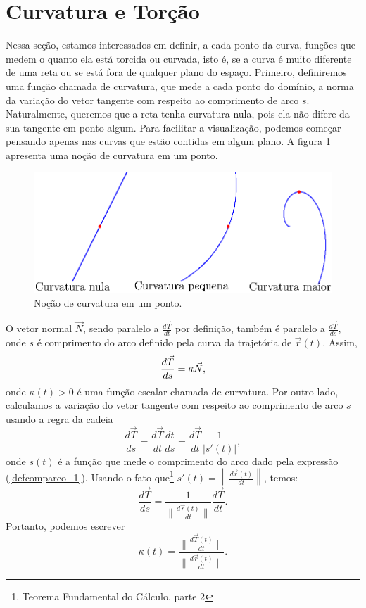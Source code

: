 \section{Curvatura e Torção}

Nessa seção, estamos interessados em definir, a cada ponto da curva, funções que medem o quanto ela está torcida ou curvada, isto é, se a curva é muito diferente de uma reta ou se está fora de qualquer plano do espaço. Primeiro, definiremos uma função chamada de curvatura, que mede a cada ponto do domínio, a norma da variação do vetor tangente com respeito ao comprimento de arco $s$. Naturalmente, queremos que a reta tenha curvatura nula, pois ela não difere da sua tangente em ponto algum. Para facilitar a visualização, podemos começar pensando apenas nas curvas que estão contidas em algum plano. A figura \ref{curvatura} apresenta uma noção de curvatura em um ponto.


\begin{figure}
\begin{center}
    \includegraphics{./cap_curvas/figs/exemplos_de_curvatura2}
 \caption{Noção de curvatura em um ponto.\label{curvatura}}
  \end{center}
\end{figure}

O vetor normal $\vec{N}$,  sendo paralelo a $\frac{d\vec{T}}{dt}$ por definição, também é paralelo a $\frac{d\vec{T}}{ds}$, onde $s$ é comprimento do arco definido pela curva da trajetória de $\vec{r}(t)$. Assim,
\begin{equation}{\label{Frenet_1}}
\frac{d \vec{T} }{ds}=\kappa   \vec{N},
\end{equation}
onde $\kappa(t)>0$ é uma função escalar chamada de curvatura. Por outro lado, calculamos a variação do vetor tangente com respeito ao comprimento de arco $s$ usando a regra da cadeia
$$
\frac{d \vec{T} }{ds}=\frac{d \vec{T} }{dt}\frac{dt}{ds}=\frac{d \vec{T} }{dt}\frac{1}{|s'(t)|},
$$
onde $s(t)$ é a função que mede o comprimento do arco dado pela expressão (\ref{defcomparco_1}). Usando o fato que\footnote{Teorema Fundamental do Cálculo, parte 2} $s'(t)=\left\|\frac{d\vec{r}(t)}{dt}\right\|$, temos:
$$
\frac{d \vec{T} }{ds}=\frac{1}{\|\frac{d\vec{r}(t)}{dt} \|}\frac{d \vec{T} }{dt}.
$$
Portanto, podemos escrever
$$
\kappa(t)=\frac{\|\frac{d\vec{T}(t)}{dt}\|}{\|\frac{d\vec{r}(t)}{dt}\|}.
$$

